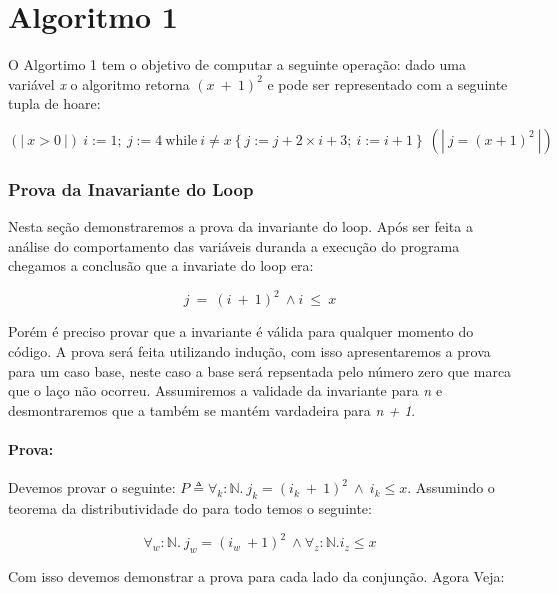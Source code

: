 \section{Algoritmo 1}
\label{sec:alg1}

O Algortimo 1 tem o objetivo de computar a seguinte operação: dado uma variável
\emph{x} o algoritmo retorna $(x\ +\ 1)^2$ e pode ser representado com a
seguinte tupla de hoare:

$$(\!|\ x > 0\ |\!)\ i := 1;\ j := 4\ \text{while}\ i \neq x \left\{j := j + 2 \times i + 3;\ i := i + 1\right\}\ (\!|\ j = (x + 1)^2\ |\!)$$

\subsubsection{Prova da Inavariante do Loop}
\label{ssub:Prova da Inavariante do Loop}

Nesta seção demonstraremos a prova da invariante do loop. Após ser feita a
análise do comportamento das variáveis duranda a execução do programa chegamos a
conclusão que a invariate do loop era:

$$ j\  =\ (i\ +\ 1)^2\ \land i\ \leq\ x $$

Porém é preciso provar que a invariante é válida para qualquer momento do
código. A prova será feita utilizando indução, com isso apresentaremos a prova
para um caso base, neste caso a base será repsentada pelo número zero que marca
que o laço não ocorreu. Assumiremos a validade da invariante para \emph{n} e
desmontraremos que a também se mantém vardadeira para \emph{n + 1}.

\paragraph{Prova:} 
Devemos provar o seguinte: $P \triangleq \forall_k :\mathbb{N} .\ j_k=(i_k\ +\ 1)^2\ \land\
i_k \leq x$. Assumindo o teorema da distributividade do para todo temos o
seguinte:

$$\forall_w :\mathbb{N}.\ j_w=(i_w\ +1)^2\ \land  \forall_z:\mathbb{N}. i_z \leq x$$

Com isso devemos demonstrar a prova para cada lado da conjunção. Agora Veja:


